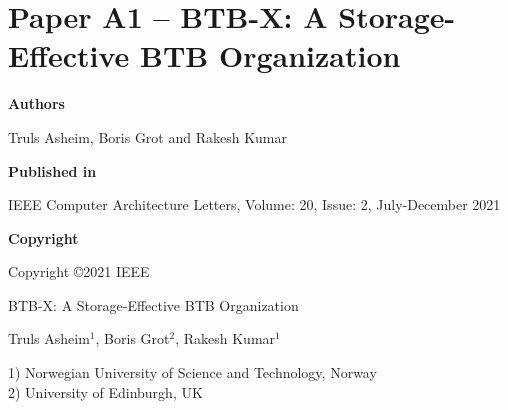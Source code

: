 \documentclass[../../../main.tex]{subfiles}
\begin{document}
\chapter{Paper A1 -- BTB-X: A Storage-Effective BTB Organization}
\label{chap:cal-paper}

\noindent \textbf{Authors}

\vspace*{0.3cm}

\noindent Truls Asheim, Boris Grot and Rakesh Kumar

\vspace*{0.7cm}

\noindent \textbf{Published in}

\vspace*{0.3cm}

\noindent IEEE Computer Architecture Letters, Volume: 20, Issue: 2, July-December 2021

\vspace*{0.7cm}

\noindent \textbf{Copyright}

\vspace*{0.3cm}

\noindent Copyright ©2021 IEEE

\newpage

\vspace*{0.1cm}

\begin{center}

\Huge{BTB-X: A Storage-Effective BTB Organization}

\vspace{0.6cm}

\large{Truls Asheim$^{1}$, Boris Grot$^{2}$, Rakesh Kumar$^{1}$}

\vspace{0.1cm}

\small{1) Norwegian University of Science and Technology, Norway}\\
\small{2) University of Edinburgh, UK}


\end{center}

\vspace{0.2cm}
\end{document}
